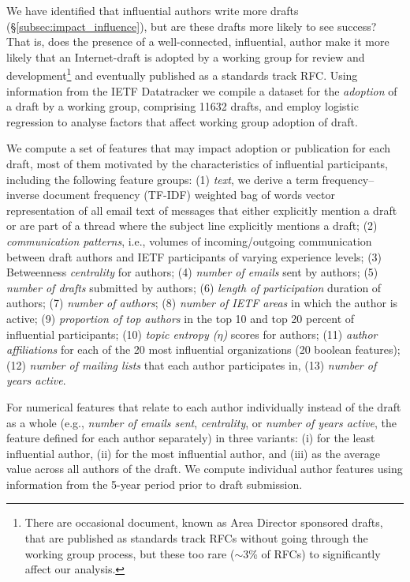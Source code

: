 \documentclass[twocolumn,10pt]{article}
\newcommand{\pb}[1]{\vspace{0.75ex}\noindent{\textbf{#1}}}
\begin{document}
We have identified that influential authors write more drafts
(\S\ref{subsec:impact_influence}), but are these drafts more likely to
see success?  That is, does the presence of a well-connected, influential,
author make it more likely that an Internet-draft is adopted by a working
group for review and development\footnote{There are occasional document,
known as Area Director sponsored drafts, that are published as standards
track RFCs without going through the working group process, but these too
rare ($\sim$3\% of RFCs) to significantly affect our analysis.} and
eventually published as a standards track RFC.  Using information from the
IETF Datatracker we compile a dataset for the \emph{adoption} of a draft by
a working group, comprising 11632 drafts, and employ logistic regression to
analyse factors that affect working group adoption of draft.

\pb{Methodology:}
We compute a set of features that may impact adoption or publication for
each draft, most of them motivated by the characteristics of influential
participants, including the following feature groups: 
 (1) \emph{text}, we derive a term frequency--inverse document
     frequency (TF-IDF) \cite{salton1983introduction} weighted bag of words vector
     representation of all email text of messages that either explicitly
     mention a draft or are part of a thread where the subject line
     explicitly mentions a draft; 
 (2) \emph{communication patterns}, i.e., volumes of incoming/outgoing communication
     between draft authors and IETF participants of varying experience levels;
 (3) Betweenness \emph{centrality} for authors;
 (4) \emph{number of emails} sent by authors;
 (5) \emph{number of drafts} submitted by authors;
 (6) \emph{length of participation} duration of authors;
 (7) \emph{number of authors};
 (8) \emph{number of IETF areas} in which the author is active;
 (9) \emph{proportion of top authors} in the top 10 and top 20 percent of
     influential participants;
(10) \emph{topic entropy ($\eta$)} scores for authors;
(11) \emph{author affiliations} for each of the 20 most influential
     organizations (20 boolean features);
(12) \emph{number of mailing lists} that each author participates in,
(13) \emph{number of years active}.

For numerical features that relate to each author individually instead of
the draft as a whole (e.g., \emph{number of emails sent}, \emph{centrality},
or \emph{number of years active}, the feature defined for each author
separately) in three variants: (i) for the least influential author, (ii)
for the most influential author, and (iii) as the average value across all
authors of the draft. We compute individual author features using
information from the 5-year period prior to draft submission.
\end{document}
